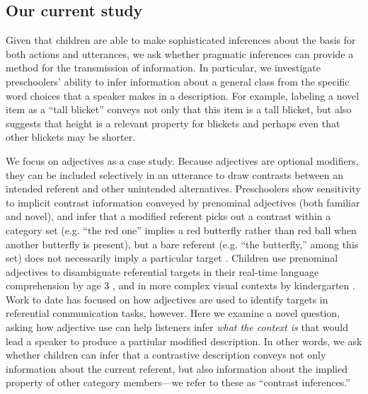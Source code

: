 \documentclass[man]{apa2}
\begin{document}

\subsection{Our current study}

Given that children are able to make sophisticated inferences about the basis for both actions and utterances, we ask whether pragmatic inferences can provide a method for the transmission of information. In particular, we investigate preschoolers' ability to infer information about a general class from the specific word choices that a speaker makes in a description. For example, labeling a novel item as a ``tall blicket'' conveys not only that this item is a tall blicket, but also suggests that height is a relevant property for blickets and perhaps even that other blickets may be shorter.   

We focus on adjectives as a case study.  Because adjectives are optional modifiers, they can be included selectively in an utterance to draw contrasts between an intended referent and other unintended alternatives. Preschoolers show sensitivity to implicit contrast information conveyed by prenominal adjectives (both familiar and novel), and infer that a modified referent picks out a contrast within a category set (e.g. ``the red one'' implies a red butterfly rather than red ball when another butterfly is present), but a bare referent (e.g. ``the butterfly,'' among this set) does not necessarily imply a particular target \cite{gelman1985}. Children use prenominal adjectives to disambiguate referential targets in their real-time language comprehension by age 3 \cite{fernald2010}, and in more complex visual contexts by kindergarten \cite{nadig2002}. Work to date has focused on how adjectives are used to identify targets in referential communication tasks, however.  Here we examine a novel question, asking how adjective use can help listeners infer \emph{what the context is} that would lead a speaker to produce a partiular modified description. In other words, we ask whether children can infer that a contrastive description conveys not only information about the current referent, but also information about the implied property of other category members---we refer to these as ``contrast inferences.'' 
\end{document}
